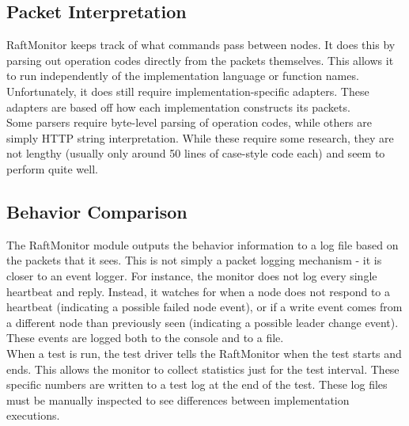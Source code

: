 \documentclass[UTF8]{article}
\begin{document}
\subsection{Packet Interpretation}
RaftMonitor keeps track of what commands pass between nodes. It does this by parsing out operation codes directly from the packets themselves. This allows it to run independently of the implementation language or function names. Unfortunately, it does still require implementation-specific adapters. These adapters are based off how each implementation constructs its packets.
\\ \indent Some parsers require byte-level parsing of operation codes, while others are  simply HTTP string interpretation. While these require some research, they are not lengthy (usually only around 50 lines of case-style code each) and seem to perform quite well.

\subsection{Behavior Comparison}
The RaftMonitor module outputs the behavior information to a log file based on the packets that it sees. This is not simply a packet logging mechanism - it is closer to an event logger. For instance, the monitor does not log every single heartbeat and reply. Instead, it watches for when a node does not respond to a heartbeat (indicating a possible failed node event), or if a write event comes from a different node than previously seen (indicating a possible leader change event). These events are logged both to the console and to a file.
\\ \indent When a test is run, the test driver tells the RaftMonitor when the test starts and ends. This allows the monitor to collect statistics just for the test interval. These specific numbers are written to a test log at the end of the test. These log files must be manually inspected to see differences between implementation executions.
\end{document}
